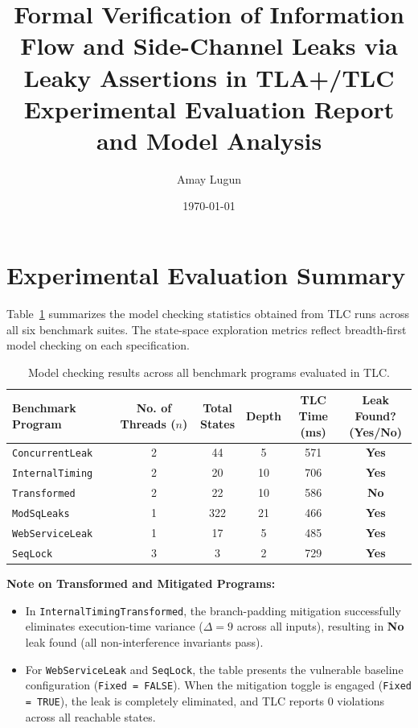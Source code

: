 \documentclass[a4paper,11pt]{article}
\title{\textbf{Formal Verification of Information Flow and Side-Channel Leaks via Leaky Assertions in TLA+/TLC}\\[0.5ex]
\large Experimental Evaluation Report and Model Analysis}
\date{\today}
\author{Amay Lugun}
\begin{document}
\maketitle


\section{Experimental Evaluation Summary}

Table~\ref{tab:benchmarks} summarizes the model checking statistics obtained from TLC runs across all six benchmark suites. The state-space exploration metrics reflect breadth-first model checking on each specification.

\begin{table}[htbp]
\centering
\small
\renewcommand{\arraystretch}{1.25}
\begin{tabularx}{\textwidth}{@{} >{\raggedright\arraybackslash}X ccccc @{}}
\toprule
\textbf{Benchmark Program} & 
\makecell{\textbf{No. of Threads} \\ \textbf{($n$)}} & 
\makecell{\textbf{Total} \\ \textbf{States}} & 
\textbf{Depth} & 
\makecell{\textbf{TLC Time} \\ \textbf{(ms)}} & 
\makecell{\textbf{Leak Found?} \\ \textbf{(Yes/No)}} \\
\midrule
\texttt{ConcurrentLeak}            & 2 & 44  & 5  & 571 & \textbf{Yes} \\
\texttt{InternalTiming}            & 2 & 20  & 10 & 706 & \textbf{Yes} \\
\texttt{Transformed} & 2 & 22  & 10 & 586 & \textbf{No}  \\
\texttt{ModSqLeaks}                & 1 & 322 & 21 & 466 & \textbf{Yes} \\
\texttt{WebServiceLeak}            & 1 & 17  & 5  & 485 & \textbf{Yes} \\
\texttt{SeqLock}                   & 3 & 3   & 2  & 729 & \textbf{Yes} \\
\bottomrule
\end{tabularx}
\caption{Model checking results across all benchmark programs evaluated in TLC.}
\label{tab:benchmarks}
\end{table}

\noindent\textbf{Note on Transformed and Mitigated Programs:}
\begin{itemize}
    \item In \texttt{InternalTimingTransformed}, the branch-padding mitigation successfully eliminates execution-time variance ($\Delta = 9$ across all inputs), resulting in \textbf{No} leak found (all non-interference invariants pass).
    \item For \texttt{WebServiceLeak} and \texttt{SeqLock}, the table presents the vulnerable baseline configuration (\texttt{Fixed = FALSE}). When the mitigation toggle is engaged (\texttt{Fixed = TRUE}), the leak is completely eliminated, and TLC reports 0 violations across all reachable states.
\end{itemize}
\end{document}
